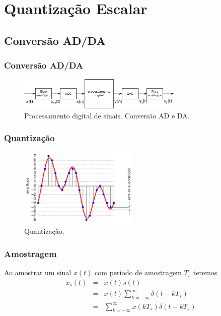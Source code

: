 \section{Quantização Escalar}
\subsection{Conversão AD/DA}
\begin{frame}%
  \frametitle{Conversão AD/DA}

  \begin{figure}[h]
  \centering
  \includegraphics[width=0.7\textwidth]{images/conversaoadda.pdf}
  \caption{Processamento digital de sinais. Conversão AD e DA.}\label{fig-conv-adda}
  \end{figure}

\end{frame}


\begin{frame}%
  \frametitle{Quantização}

  \begin{figure}[h]
  \centering
  \includegraphics[width=0.5\textwidth]{images/digitalization.pdf}
  \caption{Quantização.}\label{fig-sig-quantz}
  \end{figure}

\end{frame}

\begin{frame}%
  \frametitle{Amostragem}
  Ao amostrar um sinal $x(t)$ com período de amostragem $T_s$ teremos
  \begin{eqnarray}
  x_s(t) &=& x(t) s(t) \nonumber \\ 
        &=& x(t) \sum_{k=-\infty}^{\infty} \delta(t - kT_s) \nonumber \\
         &=& \sum_{k=-\infty}^{\infty} x(kT_s) \delta(t - kT_s)
  \end{eqnarray}

\end{frame}


